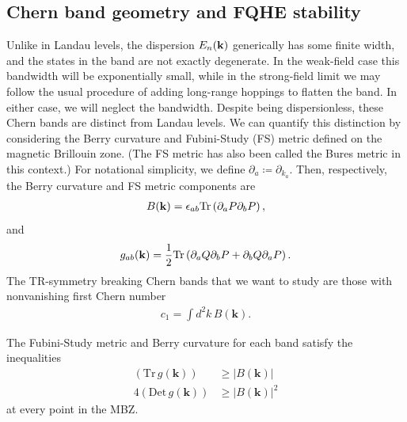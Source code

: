 \documentclass[aps,prb,twocolumn,letterpaper,twoside,nobalancelastpage,groupedaddress,amsmath,amssymb,floatfix,citeautoscript]{revtex4-1}
\begin{document}
\subsection{Chern band geometry and FQHE stability}
Unlike in Landau levels, the dispersion $E_{n}({\bf k})$ generically has some finite width, and the states in the band are not exactly degenerate. In the weak-field case this bandwidth will be exponentially small\cite{Harper:2014vi}, while in the strong-field limit we may follow the usual procedure of adding long-range hoppings to flatten the band. \cite{Bergholtz:2013ue,parameswaran_fractional_2013} In either case, we will neglect the bandwidth. Despite being dispersionless, these Chern bands are distinct from Landau levels. We can quantify this distinction by considering the Berry curvature and Fubini-Study (FS) metric defined on the magnetic Brillouin zone\cite{parameswaran_fractional_2013,roy_band_2014,Claassen2015}. (The FS metric has also been called the Bures metric in this context.\cite{palumbo_momentum-space_2017}) For notational simplicity, we define $\partial_a \coloneqq \partial_{k_a}$. Then, respectively, the Berry curvature and FS metric components are 
\begin{align*}
B({\bf k}) = \epsilon_{ab}\text{Tr}\left(\partial_{a}P\partial_b P\right),
\end{align*}
and
\begin{align*}
g_{ab}({\bf k}) = \frac{1}{2}\text{Tr}\left(\partial_{a}Q\partial_{b}P + \partial_{b}Q\partial_{a} P\right). \\
\end{align*}
The TR-symmetry breaking Chern bands that we want to study are those with nonvanishing first Chern number 
\begin{align*}
c_1 = \int d^2k\, B(\mathbf{k}).
\end{align*}

The Fubini-Study metric and Berry curvature for each band satisfy the inequalities\cite{roy_band_2014}
\begin{align*}
\left(\text{Tr}\,g(\mathbf{k})\right)&\geq|B(\mathbf{k})| \\
4\left(\text{Det}\,g(\mathbf{k})\right)&\geq|B(\mathbf{k})|^2 
\end{align*}
at every point in the MBZ.
\end{document}
